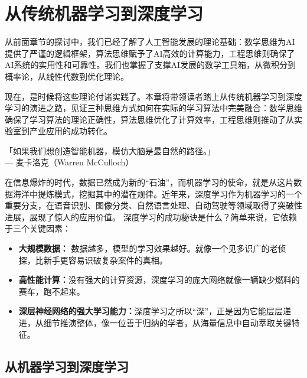 \chapter{从传统机器学习到深度学习}
从前面章节的探讨中，我们已经了解了人工智能发展的理论基础：数学思维为AI提供了严谨的逻辑框架，算法思维赋予了AI高效的计算能力，工程思维则确保了AI系统的实用性和可靠性。我们也掌握了支撑AI发展的数学工具箱，从微积分到概率论，从线性代数到优化理论。

现在，是时候将这些理论付诸实践了。本章将带领读者踏上从传统机器学习到深度学习的演进之路，见证三种思维方式如何在实际的学习算法中完美融合：数学思维确保了学习算法的理论正确性，算法思维优化了计算效率，工程思维则推动了从实验室到产业应用的成功转化。

\begin{flushright}
「如果我们想创造智能机器，模仿大脑是最自然的路径。」 \\
--- 麦卡洛克（Warren McCulloch）
\end{flushright}
在信息爆炸的时代，数据已然成为新的“石油”，而机器学习的使命，就是从这片数据海洋中提炼模式，挖掘其中的潜在规律。近年来，深度学习作为机器学习的一个重要分支，在语音识别、图像分类、自然语言处理、自动驾驶等领域取得了突破性进展，展现了惊人的应用价值。
深度学习的成功秘诀是什么？简单来说，它依赖于三个关键因素：
\begin{itemize}
\item  {\bf 大规模数据：} 数据越多，模型的学习效果越好。就像一个见多识广的老侦探，比新手更容易识破复杂案件的真相。
\item {\bf 高性能计算：}没有强大的计算资源，深度学习的庞大网络就像一辆缺少燃料的赛车，跑不起来。
\item {\bf 深层神经网络的强大学习能力：}深度学习之所以“深”，正是因为它能层层递进，从细节推演整体，像一位善于归纳的学者，从海量信息中自动萃取关键特征。
\end{itemize}
\section{从机器学习到深度学习}

